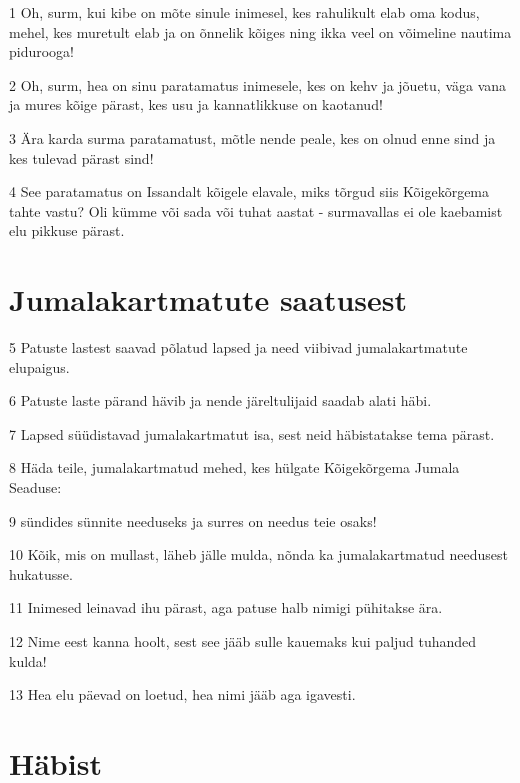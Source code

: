 \par 1 Oh, surm, kui kibe on mõte sinule inimesel, kes rahulikult elab oma kodus, mehel, kes muretult elab ja on õnnelik kõiges ning ikka veel on võimeline nautima pidurooga!
\par 2 Oh, surm, hea on sinu paratamatus inimesele, kes on kehv ja jõuetu, väga vana ja mures kõige pärast, kes usu ja kannatlikkuse on kaotanud!
\par 3 Ära karda surma paratamatust, mõtle nende peale, kes on olnud enne sind ja kes tulevad pärast sind!
\par 4 See paratamatus on Issandalt kõigele elavale, miks tõrgud siis Kõigekõrgema tahte vastu? Oli kümme või sada või tuhat aastat - surmavallas ei ole kaebamist elu pikkuse pärast.

\section*{Jumalakartmatute saatusest}

\par 5 Patuste lastest saavad põlatud lapsed ja need viibivad jumalakartmatute elupaigus.
\par 6 Patuste laste pärand hävib ja nende järeltulijaid saadab alati häbi.
\par 7 Lapsed süüdistavad jumalakartmatut isa, sest neid häbistatakse tema pärast.
\par 8 Häda teile, jumalakartmatud mehed, kes hülgate Kõigekõrgema Jumala Seaduse:
\par 9 sündides sünnite needuseks ja surres on needus teie osaks!
\par 10 Kõik, mis on mullast, läheb jälle mulda, nõnda ka jumalakartmatud needusest hukatusse.
\par 11 Inimesed leinavad ihu pärast, aga patuse halb nimigi pühitakse ära.
\par 12 Nime eest kanna hoolt, sest see jääb sulle kauemaks kui paljud tuhanded kulda!
\par 13 Hea elu päevad on loetud, hea nimi jääb aga igavesti.

\section*{Häbist}

